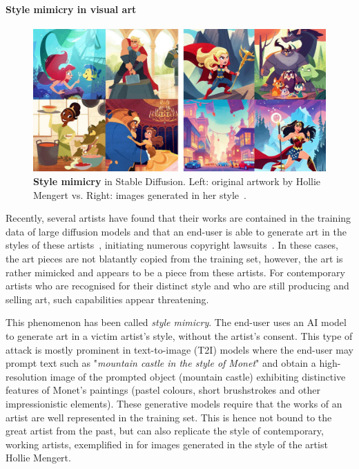\documentclass[conference,table]{IEEEtran}
\begin{document}
\paragraph{Style mimicry in visual art}
\begin{figure}[ht]
    \centering
    \includegraphics[width=\linewidth]{mimicry.jpg}
    \caption{\textbf{Style mimicry} in Stable Diffusion. Left: original artwork by Hollie Mengert vs. Right: images generated in her style~\cite{baio_invasive_2022}.}
    \label{fig:style-mimicry}
\end{figure}
Recently, several artists have found that their works are contained in the training data of large diffusion models and that an end-user is able to generate art in the styles of these artists~\cite{heikkila_this_2022}, initiating numerous copyright lawsuits~\cite{nolan_ai_2023}.
In these cases, the art pieces are not blatantly copied from the training set, however, the art is rather mimicked and appears to be a piece from these artists.
For contemporary artists who are recognised for their distinct style and who are still producing and selling art, such capabilities appear threatening.  

This phenomenon has been called \textit{style mimicry}. The end-user uses an AI model to generate art in a victim artist's style, without the artist's consent. 
This type of attack is mostly prominent in text-to-image (T2I) models where the end-user may prompt text such as "\textit{mountain castle in the style of Monet}" and obtain a high-resolution image of the prompted object (mountain castle) exhibiting distinctive features of Monet's paintings (pastel colours, short brushstrokes and other impressionistic elements). 
These generative models require that the works of an artist are well represented in the training set. This is hence not bound to the great artist from the past, but can also replicate the style of contemporary, working artists, exemplified in  for images generated in the style of the artist Hollie Mengert.
 
\end{document}
